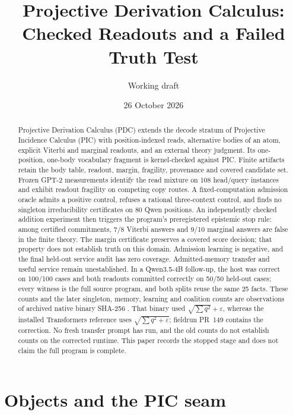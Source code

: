 \documentclass[11pt]{article}
\title{Projective Derivation Calculus:\\Checked Readouts and a Failed Truth Test}
\author{Working draft}
\date{26 October 2026}
\begin{document}
\maketitle
\begin{abstract}
Projective Derivation Calculus (PDC) extends the decode stratum of Projective
Incidence Calculus (PIC) with position-indexed reads, alternative bodies of
an atom, explicit Viterbi and marginal readouts, and an external theory
judgment. Its one-position, one-body vocabulary fragment is kernel-checked
against PIC. Finite artifacts retain the body table, readout, margin,
fragility, provenance and covered candidate set. Frozen GPT-2 measurements
identify the read mixture on 108 head/query instances and exhibit readout
fragility on competing copy routes. A fixed-computation admission oracle
admits a positive control, refuses a rational three-context control, and
finds no singleton irreducibility certificates on 80 Qwen positions.
An independently checked addition experiment then triggers the program's
preregistered epistemic stop rule: among certified commitments, 7/8 Viterbi
answers and 9/10 marginal answers are false in the finite theory.
The margin certificate preserves a covered score decision; that property
does not establish truth on this domain. Admission learning is negative,
and the final held-out service audit has zero coverage. Admitted-memory
transfer and useful service remain unestablished. In a Qwen3.5-4B follow-up,
the host was correct on 100/100 cases and both readouts committed correctly
on 50/50 held-out cases; every witness is the full source program,
and both splits reuse the same 25 facts. These counts and the later
singleton, memory, learning and coalition counts are observations of
archived native binary SHA-256
.
That binary used $\sqrt{\sum q^2}+\varepsilon$, whereas the installed
Transformers reference uses $\sqrt{\sum q^2+\varepsilon}$; fieldrun
PR~149 contains the correction. No fresh transfer prompt has run, and the
old counts do not establish counts on the corrected runtime. This paper
records the stopped stage and does not claim the full program is complete.
\end{abstract}

\section{Objects and the PIC seam}
\end{document}
